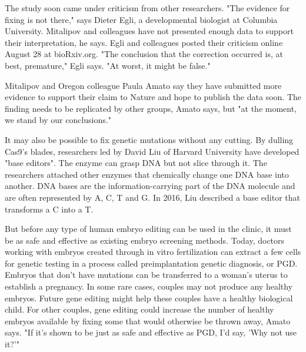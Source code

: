 \documentclass[12pt]{article}
\begin{document}
The study soon came under criticism from other researchers. "The evidence for fixing is not there," says Dieter Egli, a developmental biologist at Columbia University. Mitalipov and colleagues have not presented enough data to support their interpretation, he says. Egli and colleagues posted their criticism online August 28 at bioRxiv.org. "The conclusion that the correction occurred is, at best, premature," Egli says. "At worst, it might be false."

Mitalipov and Oregon colleague Paula Amato say they have submitted more evidence to support their claim to Nature and hope to publish the data soon. The finding needs to be replicated by other groups, Amato says, but "at the moment, we stand by our conclusions."

It may also be possible to fix genetic mutations without any cutting. By dulling Cas9's blades, researchers led by David Liu of Harvard University have developed "base editors". The enzyme can grasp DNA but not slice through it. The researchers attached other enzymes that chemically change one DNA base into another. DNA bases are the information-carrying part of the DNA molecule and are often represented by A, C, T and G. In 2016, Liu described a base editor that transforms a C into a T.

But before any type of human embryo editing can be used in the clinic, it must be as safe and effective as existing embryo screening methods. Today, doctors working with embryos created through in vitro fertilization can extract a few cells for genetic testing in a process called preimplantation genetic diagnosis, or PGD. Embryos that don't have mutations can be transferred to a woman's uterus to establish a pregnancy. In some rare cases, couples may not produce any healthy embryos. Future gene editing might help these couples have a healthy biological child. For other couples, gene editing could increase the number of healthy embryos available by fixing some that would otherwise be thrown away, Amato says. "If it's shown to be just as safe and effective as PGD, I'd say, 'Why not use it?'"
\end{document}
